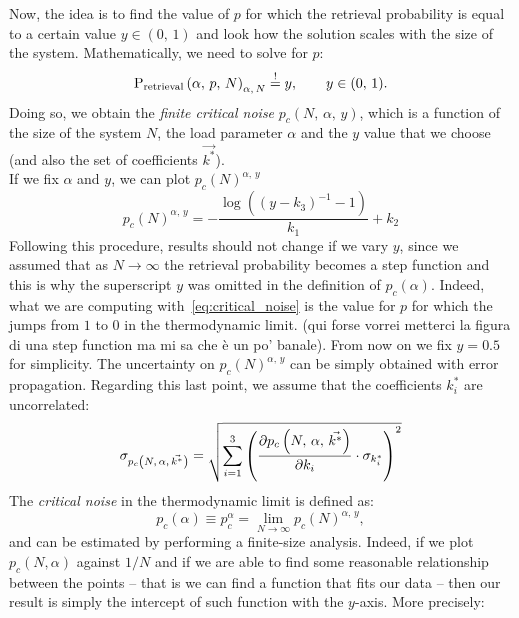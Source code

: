 \documentclass[\rootdir/main.tex]{subfiles}
\begin{document}
Now, the idea is to find the value of $p$ for which the retrieval probability is equal to a certain value $y \in (0,\, 1)$ and look how the solution scales with the size of the system. Mathematically, we need to solve for $p$:
\begin{equation}\label{eq:finite_critical_noise}
     \mathrm{P}_{\text{retrieval}} \left( \alpha, \, p, \, N \right) _{\alpha,\, N} \overset{!}{=} y, \qquad y \in (0,\, 1).
\end{equation}
Doing so, we obtain the \emph{finite critical noise} $p_c\left(N,\,\alpha,\,y\right)$, which is a function of the size of the system $N$, the load parameter $\alpha$ and the $y$ value that we choose (and also the set of coefficients $\vec{k^*}$).\\
If we fix $\alpha$ and $y$, we can plot $p_c(N)^{\alpha,\, y}$
\begin{equation}\label{eq:solution_fit}
    p_c(N)^{\alpha,\, y} = - \frac{\log\left(\left(y - k_3\right)^{-1} - 1\right)}{k_1} + k_2
\end{equation}
Following this procedure, results should not change if we vary $y$, since we assumed that as $N \to \infty$ the retrieval probability becomes a step function and this is why the superscript $y$ was omitted in the definition of $p_c\left(\alpha\right)$. Indeed, what we are computing with~\cref{eq:critical_noise} is the value for $p$ for which the  jumps from $1$ to $0$ in the thermodynamic limit. (qui forse vorrei metterci la figura di una step function ma mi sa che è un po' banale). From now on we fix $y = 0.5$ for simplicity.
The uncertainty on $p_c\left(N\right)^{\alpha,\, y}$ can be simply obtained with error propagation. Regarding this last point, we assume that the coefficients $k_{i}^{*}$ are uncorrelated:
\begin{equation}
    \sigma_{p_c\left(N,\,\alpha,\,\vec{k^{*}}\right)} = \sqrt{ \sum_{i = 1}^{3} \left( \frac{\partial p_c\left(N,\,\alpha,\,\vec{k^{*}}\right)}{\partial k_i} \cdot \sigma_{k_i^*} \right)^2 }   
\end{equation}
The \emph{critical noise} in the thermodynamic limit is defined as:
\begin{equation}\label{eq:critical_noise}
   p_c\left(\alpha\right) \equiv p_c^{\alpha} = \lim_{N \to \infty} p_c(N)^{\alpha,\, y},
\end{equation}
and can be estimated by performing a finite-size analysis. Indeed, if we plot $p_c \left(N, \alpha\right)$ against $1/N$ and if we are able to find some reasonable relationship between the points -- that is we can find a function that fits our data -- then our result is simply the intercept of such function with the $y$-axis. More precisely:
\end{document}
